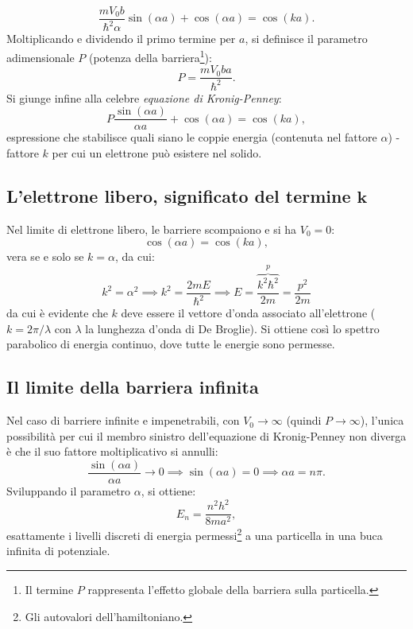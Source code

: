\documentclass[a4paper,11pt]{report}
\begin{document}
\begin{equation}
    \frac{m V_0 b}{\hbar^2 \alpha} \sin(\alpha a) + \cos(\alpha a) = \cos(ka).
\end{equation}
Moltiplicando e dividendo il primo termine per $a$, si definisce il parametro adimensionale $P$ (potenza della barriera\footnote{Il termine $P$ rappresenta l'effetto globale della barriera sulla particella.}):
\begin{equation}
    P = \frac{m V_0 b a}{\hbar^2}.
\end{equation}
Si giunge infine alla celebre \textit{equazione di Kronig-Penney}:
\begin{equation}
    P \frac{\sin(\alpha a)}{\alpha a} + \cos(\alpha a) = \cos(ka),
\end{equation}
espressione che stabilisce quali siano le coppie energia (contenuta nel fattore $\alpha$) - fattore $k$ per cui un elettrone può esistere nel solido.   

\subsection{L'elettrone libero, significato del termine $\bm{k}$}
Nel limite di elettrone libero, le barriere scompaiono e si ha $V_0 = 0$:
\begin{equation}
 \cos(\alpha a) = \cos(ka),
\end{equation}
vera se e solo se $k = \alpha$, da cui:
\begin{equation}
 k^2 = \alpha^2 \implies k^2 = \frac{2mE}{\hbar^2} \implies E = \frac{\overbrace{k^2\hbar^2}^{p}}{2m} = \frac{p^2}{2m}
\end{equation}
da cui è evidente che $k$ deve essere il vettore d'onda associato all'elettrone ($k = 2\pi/\lambda$ con $\lambda$ la lunghezza d'onda di De Broglie). Si ottiene così lo spettro parabolico di energia continuo, dove tutte le energie sono permesse.

\subsection{Il limite della barriera infinita}
Nel caso di barriere infinite e impenetrabili, con $V_0 \to \infty$ (quindi $P \to \infty$), l'unica possibilità per cui il membro sinistro dell'equazione di Kronig-Penney non diverga è che il suo fattore moltiplicativo si annulli: 
    \begin{equation}
        \frac{\sin(\alpha a)}{\alpha a} \to 0 \implies \sin(\alpha a) = 0 \implies \alpha a = n\pi.
    \end{equation}
    Sviluppando il parametro $\alpha$, si ottiene:
        \begin{equation}
         E_n = \frac{n^2h^2}{8ma^2},
    \end{equation}
    esattamente i livelli discreti di energia permessi\footnote{Gli autovalori dell'hamiltoniano.} a una particella in una buca infinita di potenziale.
    
\end{document}
